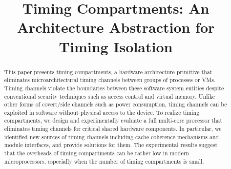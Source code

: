 \title{
\vspace{-0.1in}
    Timing Compartments: An Architecture Abstraction for Timing Isolation
}



\date{}
\maketitle

\thispagestyle{empty}

\begin{abstract}
    This paper presents timing compartments, a hardware architecture primitive 
    that eliminates microarchitectural timing channels between groups of 
    processes or VMs. Timing channels violate the boundaries between these 
    software system entities despite conventional security techniques such as 
    access control and virtual memory. Unlike other forms of covert/side channels such 
    as power consumption, timing channels can be exploited in software without 
    physical access to the device. 
    To realize timing 
    compartments, we design and experimentally evaluate a full multi-core 
    processor that eliminates timing channels for critical shared hardware 
    components. 
    In particular, we identified new sources of timing channels including
    cache coherence mechanisms and module interfaces, and provide solutions for them.
    The experimental results suggest that the overheads of
    timing compartments can be rather low in modern microprocessors, especially 
    when the number of timing compartments is small.

\end{abstract}

